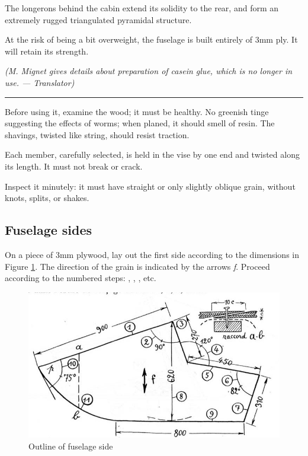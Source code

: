 \documentclass{book}
\newcommand*\circled[1]{\tikz[baseline=(char.base)]{
    \node[shape=circle,draw,inner sep=1pt] (char) {#1};}}
\newcommand*\sectline{
  \vspace{5pt}
  \begin{center}
    \rule{0.5\linewidth}{\linethickness}
  \end{center}
  \vspace{5pt}
}
\begin{document}
The longerons behind the cabin extend its solidity to the rear, and
form an extremely rugged triangulated pyramidal structure.

At the risk of being a bit overweight, the fuselage is built entirely
of 3mm ply.  It will retain its strength.

\textit{(M. Mignet gives details about preparation of casein glue,
  which is no longer in use. --- Translator)}

\sectline

Before using it, examine the wood; it must be healthy.  No greenish
tinge suggesting the effects of worms; when planed, it should smell of
resin. The shavings, twisted like string, should resist traction.

Each member, carefully selected, is held in the vise by one end and
twisted along its length.  It must not break or crack.

Inspect it minutely: it must have straight or only slightly oblique
grain, without knots, splits, or shakes.

\subsection{Fuselage sides}

On a piece of 3mm plywood, lay out the first side according to the
dimensions in Figure \ref{fig:sixteen}.  The direction of the grain is
indicated by the arrows \textsl{f}.  Proceed according to the numbered
steps: \circled{1}, \circled{2}, \circled{3}, etc.

\begin{figure}
  \includegraphics[width=\linewidth]{fig-16.jpg}
  \caption{Outline of fuselage side}
  \label{fig:sixteen}
\end{figure}
\end{document}
